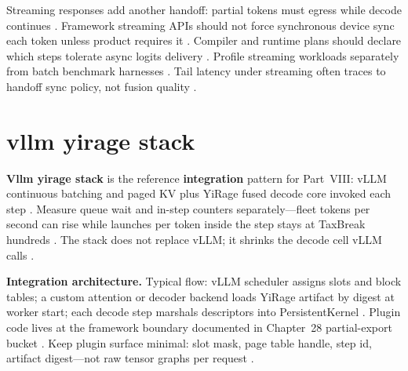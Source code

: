Streaming responses add another handoff: partial tokens must egress while decode continues \citep{kwon2023vllm,patel2025llminference,yirage2026,chen2020compilerbasedhardw,dlbook}. Framework streaming APIs should not force synchronous device sync each token unless product requires it \citep{patel2025llminference,kwon2023vllm,yirage2026,chen2020compilerbasedhardw,dlbook}. Compiler and runtime plans should declare which steps tolerate async logits delivery \citep{yirage2026,chen2020compilerbasedhardw,patel2025llminference,dlbook}. Profile streaming workloads separately from batch benchmark harnesses \citep{patel2025llminference,yirage2026,chen2020compilerbasedhardw,kwon2023vllm,dlbook}. Tail latency under streaming often traces to handoff sync policy, not fusion quality \citep{patel2025llminference,yirage2026,chen2020compilerbasedhardw,kwon2023vllm,memoryfloor2026,taxbreak2026,dlbook}.

\section{vllm yirage stack}
\label{sec:ch30_vllm_yirage_stack}

\textbf{Vllm yirage stack} is the reference \textbf{integration} pattern for Part~VIII: vLLM continuous batching and paged KV plus YiRage fused decode core invoked each step \citep{kwon2023vllm,yirage2026,patel2025llminference,taxbreak2026,memoryfloor2026,chen2020compilerbasedhardw,liu2024deepseekv3,nvidia2024cudagraphs,dao2022flashattention,semianalysis2024tma,dlbook,amd2024xdna,amd2024aie,dao2023flashdecoding,nvidia2022hopper}. Measure queue wait and in-step counters separately---fleet tokens per second can rise while launches per token inside the step stays at TaxBreak hundreds \citep{taxbreak2026,kwon2023vllm,patel2025llminference,yirage2026,chen2020compilerbasedhardw,memoryfloor2026,dlbook}. The stack does not replace vLLM; it shrinks the decode cell vLLM calls \citep{kwon2023vllm,yirage2026,chen2020compilerbasedhardw,patel2025llminference,dlbook}.

\textbf{Integration architecture.} Typical flow: vLLM scheduler assigns slots and block tables; a custom attention or decoder backend loads YiRage artifact by digest at worker start; each decode step marshals descriptors into PersistentKernel \citep{kwon2023vllm,yirage2026,chen2020compilerbasedhardw,patel2025llminference,nvidia2024cudagraphs,memoryfloor2026,taxbreak2026,dlbook}. Plugin code lives at the framework boundary documented in Chapter~28 partial-export bucket \citep{patel2025llminference,yirage2026,chen2020compilerbasedhardw,kwon2023vllm,nvidia2024cudagraphs,dlbook}. Keep plugin surface minimal: slot mask, page table handle, step id, artifact digest---not raw tensor graphs per request \citep{kwon2023vllm,yirage2026,chen2020compilerbasedhardw,patel2025llminference,dlbook}.

